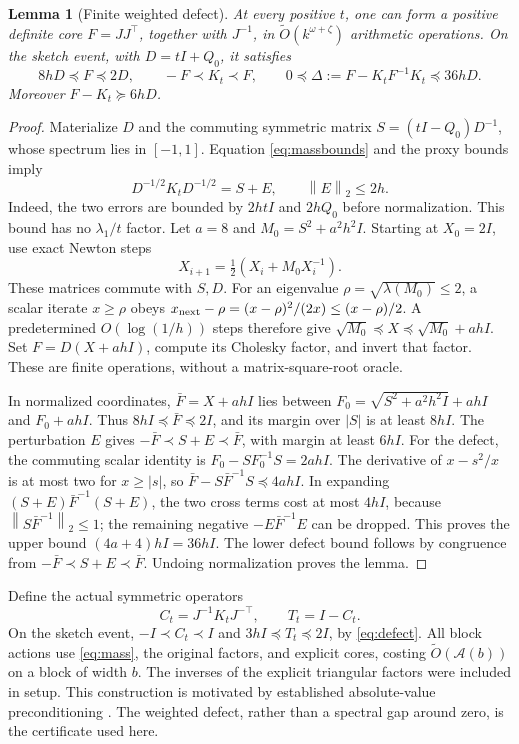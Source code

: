 \documentclass[11pt]{article}
\newtheorem{lemma}[theorem]{Lemma}
\newcommand{\norm}[1]{\left\lVert#1\right\rVert}
\newcommand{\tO}{\widetilde O}
\newcommand{\Ac}{\mathcal A}
\begin{document}
\begin{lemma}[Finite weighted defect]\label{lem:defect}
At every positive \(t\), one can form a positive definite core
\(F=JJ^\top\), together with \(J^{-1}\), in
\(\tO(k^{\omega+\zeta})\) arithmetic operations. On the sketch event,
with \(D=tI+Q_0\), it satisfies
\begin{equation}\label{eq:defect}
 8hD\preceq F\preceq2D,\qquad -F\prec K_t\prec F,\qquad
 0\preceq\Delta:=F-K_tF^{-1}K_t\preceq36hD.
\end{equation}
Moreover \(F-K_t\succeq6hD\).
\end{lemma}
\begin{proof}
Materialize \(D\) and the commuting symmetric matrix
\(S=(tI-Q_0)D^{-1}\), whose spectrum lies in \([-1,1]\).
Equation \eqref{eq:massbounds} and the proxy bounds imply
\[
 D^{-1/2}K_tD^{-1/2}=S+E,\qquad \norm E_2\leq2h.
\]
Indeed, the two errors are bounded by \(2htI\) and \(2hQ_0\)
before normalization. This bound has no \(\lambda_1/t\) factor.
Let \(a=8\) and \(M_0=S^2+a^2h^2I\). Starting at \(X_0=2I\),
use exact Newton steps
\[
 X_{i+1}=\tfrac12(X_i+M_0X_i^{-1}).
\]
These matrices commute with \(S,D\). For an eigenvalue
\(\rho=\sqrt{\lambda(M_0)}\leq2\), a scalar iterate \(x\geq\rho\)
obeys \(x_{\rm next}-\rho=(x-\rho)^2/(2x)\leq(x-\rho)/2\).
A predetermined \(O(\log(1/h))\) steps therefore give
\(\sqrt{M_0}\preceq X\preceq\sqrt{M_0}+ahI\).
Set \(F=D(X+ahI)\), compute its Cholesky factor, and invert that factor.
These are finite operations, without a matrix-square-root oracle.

In normalized coordinates, \(\bar F=X+ahI\) lies between
\(F_0=\sqrt{S^2+a^2h^2I}+ahI\) and \(F_0+ahI\).
Thus \(8hI\preceq\bar F\preceq2I\), and its margin over \(|S|\)
is at least \(8hI\). The perturbation \(E\) gives
\(-\bar F\prec S+E\prec\bar F\), with margin at least \(6hI\).
For the defect, the commuting scalar identity is
\(F_0-SF_0^{-1}S=2ahI\). The derivative of \(x-s^2/x\) is at most
two for \(x\geq|s|\), so
\(\bar F-S\bar F^{-1}S\preceq4ahI\).
In expanding \((S+E)\bar F^{-1}(S+E)\), the two cross terms cost
at most \(4hI\), because \(\norm{S\bar F^{-1}}_2\leq1\);
the remaining negative \(-E\bar F^{-1}E\) can be dropped.
This proves the upper bound \((4a+4)hI=36hI\).
The lower defect bound follows by congruence from
\(-\bar F\prec S+E\prec\bar F\). Undoing normalization proves the lemma.
\end{proof}

Define the actual symmetric operators
\begin{equation}\label{eq:CT}
 C_t=J^{-1}K_tJ^{-\top},\qquad T_t=I-C_t.
\end{equation}
On the sketch event, \(-I\prec C_t\prec I\) and
\(3hI\preceq T_t\preceq2I\), by \eqref{eq:defect}.
All block actions use \eqref{eq:mass}, the original factors, and explicit
cores, costing \(\tO(\Ac(b))\) on a block of width \(b\).
The inverses of the explicit triangular factors were included in setup.
This construction is motivated by established absolute-value preconditioning
\cite{vk,vy,plhr}. The weighted defect, rather than a spectral gap around
zero, is the certificate used here.
\end{document}
